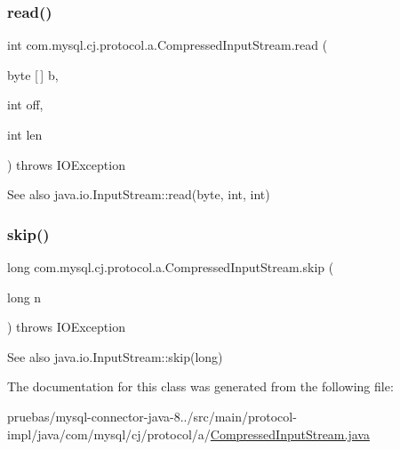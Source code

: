 \subsubsection{\texorpdfstring{read()}{read()}\hspace{0.1cm}{\footnotesize\ttfamily [3/3]}}
{\footnotesize\ttfamily int com.\+mysql.\+cj.\+protocol.\+a.\+Compressed\+Input\+Stream.\+read (\begin{DoxyParamCaption}\item[{byte \mbox{[}$\,$\mbox{]}}]{b,  }\item[{int}]{off,  }\item[{int}]{len }\end{DoxyParamCaption}) throws I\+O\+Exception}

\begin{DoxySeeAlso}{See also}
java.\+io.\+Input\+Stream\+::read(byte, int, int) 
\end{DoxySeeAlso}
\mbox{\label{classcom_1_1mysql_1_1cj_1_1protocol_1_1a_1_1_compressed_input_stream_af52c6a22e9a2c960a9bc5b7d5b9a95e7}} 
\subsubsection{\texorpdfstring{skip()}{skip()}}
{\footnotesize\ttfamily long com.\+mysql.\+cj.\+protocol.\+a.\+Compressed\+Input\+Stream.\+skip (\begin{DoxyParamCaption}\item[{long}]{n }\end{DoxyParamCaption}) throws I\+O\+Exception}

\begin{DoxySeeAlso}{See also}
java.\+io.\+Input\+Stream\+::skip(long) 
\end{DoxySeeAlso}


The documentation for this class was generated from the following file\+:\begin{DoxyCompactItemize}
\item 
pruebas/mysql-\/connector-\/java-\/8../src/main/protocol-\/impl/java/com/mysql/cj/protocol/a/\mbox{\hyperlink{_compressed_input_stream_8java}{Compressed\+Input\+Stream.\+java}}\end{DoxyCompactItemize}
